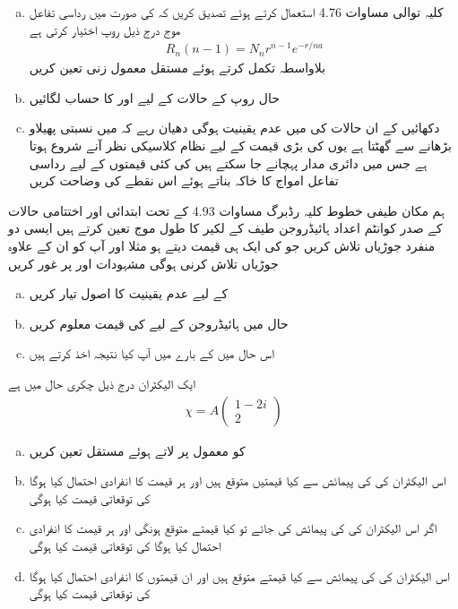 \begin{enumerate}[a.]
\item
کلیہ توالی مساوات 4.76 استعمال کرتے ہوئے تصدیق کریں کہ  کی صورت میں رداسی تفاعل موج درج ذیل روپ اختیار کرتی ہے 
\begin{align*}
R_n (n - 1) = N_n r^{n - 1} e^{-r/na}
\end{align*}
بلاواسطہ تکمل کرتے ہوئے مستقل معمول زنی  تعین کریں 
\item
حال  روپ کے حالات کے لیے  اور  کا حساب لگائیں 
\item
دکھائیں کے ان حالات کی   میں عدم یقینیت  ہوگی دھیان رہے کہ  میں نسبتی پهيلاو  بڑھانے سے گھٹتا ہے یوں  کی بڑی قیمت کے لیے نظام کلاسیکی نظر آنے شروع ہوتا ہے جس میں دائری مدار پہچانے جا سکتے ہیں  کی کئی قیمتوں کے لیے رداسی تفاعل امواج کا خاکہ بناتے ہوئے اس نقطے کی وضاحت کریں 
\end{enumerate}
ہم مکان طیفی خطوط کلیہ رڈبرگ مساوات 4.93 کے تحت ابتدائی اور اختتامی حالات کے صدر کوانٹم اعداد ہائیڈروجن طيف کے لکیر کا طول موج تعین کرتے ہیں ایسی دو منفرد جوڑیاں  تلاش کریں جو  کی ایک ہی قیمت دیتے ہو مثلا  اور  آپ کو ان کے علاوہ جوڑیاں تلاش کرنی ہوگی 
مشہودات  اور  پر غور کریں 
\begin{enumerate}[a.]
\item
{} کے لیے عدم یقینیت کا اصول تیار کریں 
\item
حال  میں ہائیڈروجن کے لیے  کی قیمت معلوم کریں 
\item
اس حال میں  کے بارے میں آپ کیا نتیجہ اخذ کرتے ہیں 
\end{enumerate}
ایک الیکٹران درج ذیل چکری حال میں ہے 
\begin{align*}
\chi = A
\begin{pmatrix}
1 - 2i \\
2
\end{pmatrix}
\end{align*}
\begin{enumerate}[a.]
\item
{} کو معمول پر لاتے ہوئے مستقل  تعین کریں 
\item
اس الیکٹران کی  کی پیمائش سے کیا قیمتیں متوقع ہیں اور ہر قیمت کا انفرادی احتمال کیا ہوگا  کی توقعاتی قیمت کیا ہوگی 
\item
اگر اس الیکٹران کی  کی پیمائش کی جائے تو کیا قیمتے متوقع ہونگی اور ہر قیمت کا انفرادی احتمال کیا ہوگا  کی توقعاتی قیمت کیا ہوگی 
\item
اس الیکٹران کی  کی پیمائش سے کیا قیمتے متوقع ہیں اور ان قیمتوں کا انفرادی احتمال کیا ہوگا  کی توقعاتی قیمت کیا ہوگی 
\end{enumerate}


